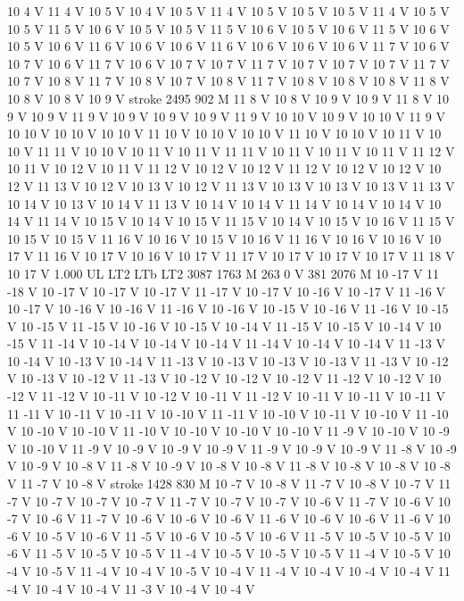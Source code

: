 {{10 4 V
11 4 V
10 5 V
10 4 V
10 5 V
11 4 V
10 5 V
10 5 V
10 5 V
11 4 V
10 5 V
10 5 V
11 5 V
10 6 V
10 5 V
10 5 V
11 5 V
10 6 V
10 5 V
10 6 V
11 5 V
10 6 V
10 5 V
10 6 V
11 6 V
10 6 V
10 6 V
11 6 V
10 6 V
10 6 V
10 6 V
11 7 V
10 6 V
10 7 V
10 6 V
11 7 V
10 6 V
10 7 V
10 7 V
11 7 V
10 7 V
10 7 V
10 7 V
11 7 V
10 7 V
10 8 V
11 7 V
10 8 V
10 7 V
10 8 V
11 7 V
10 8 V
10 8 V
10 8 V
11 8 V
10 8 V
10 8 V
10 9 V
stroke
2495 902 M
11 8 V
10 8 V
10 9 V
10 9 V
11 8 V
10 9 V
10 9 V
11 9 V
10 9 V
10 9 V
10 9 V
11 9 V
10 10 V
10 9 V
10 10 V
11 9 V
10 10 V
10 10 V
10 10 V
11 10 V
10 10 V
10 10 V
11 10 V
10 10 V
10 11 V
10 10 V
11 11 V
10 10 V
10 11 V
10 11 V
11 11 V
10 11 V
10 11 V
10 11 V
11 12 V
10 11 V
10 12 V
10 11 V
11 12 V
10 12 V
10 12 V
11 12 V
10 12 V
10 12 V
10 12 V
11 13 V
10 12 V
10 13 V
10 12 V
11 13 V
10 13 V
10 13 V
10 13 V
11 13 V
10 14 V
10 13 V
10 14 V
11 13 V
10 14 V
10 14 V
11 14 V
10 14 V
10 14 V
10 14 V
11 14 V
10 15 V
10 14 V
10 15 V
11 15 V
10 14 V
10 15 V
10 16 V
11 15 V
10 15 V
10 15 V
11 16 V
10 16 V
10 15 V
10 16 V
11 16 V
10 16 V
10 16 V
10 17 V
11 16 V
10 17 V
10 16 V
10 17 V
11 17 V
10 17 V
10 17 V
10 17 V
11 18 V
10 17 V
1.000 UL
LT2
LTb
LT2
3087 1763 M
263 0 V
381 2076 M
10 -17 V
11 -18 V
10 -17 V
10 -17 V
10 -17 V
11 -17 V
10 -17 V
10 -16 V
10 -17 V
11 -16 V
10 -17 V
10 -16 V
10 -16 V
11 -16 V
10 -16 V
10 -15 V
10 -16 V
11 -16 V
10 -15 V
10 -15 V
11 -15 V
10 -16 V
10 -15 V
10 -14 V
11 -15 V
10 -15 V
10 -14 V
10 -15 V
11 -14 V
10 -14 V
10 -14 V
10 -14 V
11 -14 V
10 -14 V
10 -14 V
11 -13 V
10 -14 V
10 -13 V
10 -14 V
11 -13 V
10 -13 V
10 -13 V
10 -13 V
11 -13 V
10 -12 V
10 -13 V
10 -12 V
11 -13 V
10 -12 V
10 -12 V
10 -12 V
11 -12 V
10 -12 V
10 -12 V
11 -12 V
10 -11 V
10 -12 V
10 -11 V
11 -12 V
10 -11 V
10 -11 V
10 -11 V
11 -11 V
10 -11 V
10 -11 V
10 -10 V
11 -11 V
10 -10 V
10 -11 V
10 -10 V
11 -10 V
10 -10 V
10 -10 V
11 -10 V
10 -10 V
10 -10 V
10 -10 V
11 -9 V
10 -10 V
10 -9 V
10 -10 V
11 -9 V
10 -9 V
10 -9 V
10 -9 V
11 -9 V
10 -9 V
10 -9 V
11 -8 V
10 -9 V
10 -9 V
10 -8 V
11 -8 V
10 -9 V
10 -8 V
10 -8 V
11 -8 V
10 -8 V
10 -8 V
10 -8 V
11 -7 V
10 -8 V
stroke
1428 830 M
10 -7 V
10 -8 V
11 -7 V
10 -8 V
10 -7 V
11 -7 V
10 -7 V
10 -7 V
10 -7 V
11 -7 V
10 -7 V
10 -7 V
10 -6 V
11 -7 V
10 -6 V
10 -7 V
10 -6 V
11 -7 V
10 -6 V
10 -6 V
10 -6 V
11 -6 V
10 -6 V
10 -6 V
11 -6 V
10 -6 V
10 -5 V
10 -6 V
11 -5 V
10 -6 V
10 -5 V
10 -6 V
11 -5 V
10 -5 V
10 -5 V
10 -6 V
11 -5 V
10 -5 V
10 -5 V
11 -4 V
10 -5 V
10 -5 V
10 -5 V
11 -4 V
10 -5 V
10 -4 V
10 -5 V
11 -4 V
10 -4 V
10 -5 V
10 -4 V
11 -4 V
10 -4 V
10 -4 V
10 -4 V
11 -4 V
10 -4 V
10 -4 V
11 -3 V
10 -4 V
10 -4 V
}}
